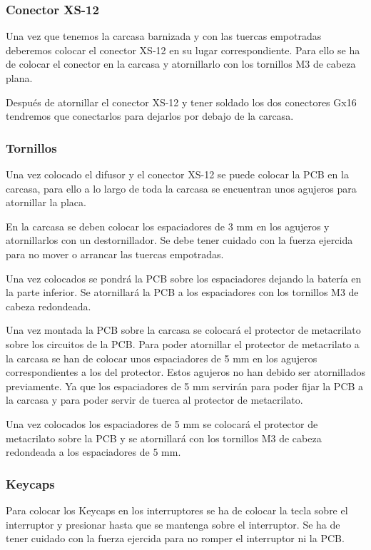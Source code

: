 \subsubsection{Conector XS-12}
Una vez que tenemos la carcasa barnizada y con las tuercas empotradas deberemos colocar el conector XS-12 en su lugar correspondiente. Para ello se ha de colocar el conector en la carcasa y atornillarlo con los tornillos M3 de cabeza plana.

Después de atornillar el conector XS-12 y tener soldado los dos conectores Gx16 tendremos que conectarlos para dejarlos por debajo de la carcasa.

\subsubsection{Tornillos}
Una vez colocado el difusor y el conector XS-12 se puede colocar la \gls{PCB} en la carcasa, para ello a lo largo de toda la carcasa se encuentran unos agujeros para atornillar la placa.

En la carcasa se deben colocar los espaciadores de 3 mm en los agujeros y atornillarlos con un destornillador. Se debe tener cuidado con la fuerza ejercida para no mover o arrancar las tuercas empotradas.

Una vez colocados se pondrá la \gls{PCB} sobre los espaciadores dejando la batería en la parte inferior. Se atornillará la \gls{PCB} a los espaciadores con los tornillos M3 de cabeza redondeada.

Una vez montada la \gls{PCB} sobre la carcasa se colocará el protector de metacrilato sobre los circuitos de la \gls{PCB}. Para poder atornillar el protector de metacrilato a la carcasa se han de colocar unos espaciadores de 5 mm en los agujeros correspondientes a los del protector. Estos agujeros no han debido ser atornillados previamente. Ya que los espaciadores de 5 mm servirán para poder fijar la \gls{PCB} a la carcasa y para poder servir de tuerca al protector de metacrilato.

Una vez colocados los espaciadores de 5 mm se colocará el protector de metacrilato sobre la \gls{PCB} y se atornillará con los tornillos M3 de cabeza redondeada a los espaciadores de 5 mm.

\subsubsection{\gls{Keycaps}}
Para colocar los \gls{Keycaps} en los interruptores se ha de colocar la tecla sobre el interruptor y presionar hasta que se mantenga sobre el interruptor. Se ha de tener cuidado con la fuerza ejercida para no romper el interruptor ni la \gls{PCB}.